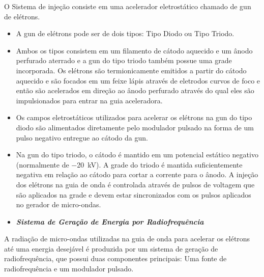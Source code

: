 \documentclass[11pt,a4paper]{article}
\begin{document}
                O Sistema de injeção consiste em uma acelerador eletrostático chamado de gun de elétrons.

                \begin{itemize}
                    \item A gun de elétrons pode ser de dois tipos: Tipo Diodo ou Tipo Triodo.
                    
                    \item Ambos os tipos consistem em um filamento de cátodo aquecido e um ânodo perfurado aterrado e a gun do tipo triodo também possue uma grade incorporada. Os elétrons são  termionicamente emitidos a partir do cátodo aquecido e são focados em um feixe lápis através de eletrodos curvos de foco e então são acelerados em direção ao ânodo perfurado  através do qual eles são impulsionados para entrar na guia aceleradora.
                    
                    \item Os campos eletrostáticos utilizados para acelerar os elétrons na gun do tipo diodo são alimentados diretamente pelo modulador pulsado na forma de um pulso negativo entregue ao cátodo da gun.
                    
                    \item Na gun do tipo triodo, o cátodo é mantido em um potencial estático negativo (normalmente de \qty{-20}{kV}). A grade do triodo é mantida suficientemente negativa em relação ao cátodo para cortar a corrente para o ânodo. A injeção dos elétrons na guia de onda é controlada através de pulsos de voltagem que são aplicados na grade e devem estar sincronizados com os pulsos aplicados no gerador de micro-ondas.
                \end{itemize}
                  
            
                \begin{itemize}
                    \item \textbf{\textit{\textcolor{CarnationPink}{Sistema de Geração de Energia por Radiofrequência}}}
                \end{itemize}

                    A radiação de micro-ondas utilizadas na guia de onda para acelerar os elétrons até uma energia desejável é produzida por um sistema de geração de radiofrequência, que possui duas componentes principais: Uma fonte de radiofrequência e um modulador pulsado. 
\end{document}
